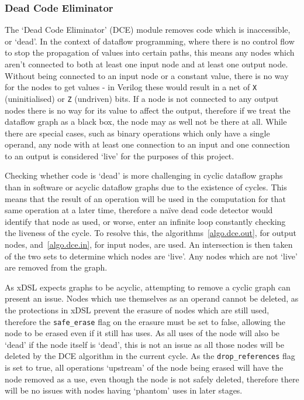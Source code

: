 \subsubsection{Dead Code Eliminator}
The `Dead Code Eliminator' (DCE) module removes code which is inaccessible, or `dead'. In the context of dataflow programming, where there is no control flow to stop the propagation of values into certain paths, this means any nodes which aren't connected to both at least one input node and at least one output node. Without being connected to an input node or a constant value, there is no way for the nodes to get values \hyphen{} in Verilog these would result in a net of \lstinline|X| (uninitialised) or \lstinline|Z| (undriven) bits. If a node is not connected to any output nodes there is no way for its value to affect the output, therefore if we treat the dataflow graph as a black box, the node may as well not be there at all. While there are special cases, such as binary operations which only have a single operand, any node with at least one connection to an input and one connection to an output is considered `live' for the purposes of this project.

Checking whether code is `dead' is more challenging in cyclic dataflow graphs than in software or acyclic dataflow graphs due to the existence of cycles. This means that the result of an operation will be used in the computation for that same operation at a later time, therefore a naïve dead code detector would identify that node as used, or worse, enter an infinite loop constantly checking the liveness of the cycle. To resolve this, the algorithms \ref{algo.dce.out}, for output nodes, and \ref{algo.dce.in}, for input nodes, are used. An intersection is then taken of the two sets to determine which nodes are `live'. Any nodes which are not `live' are removed from the graph.

As xDSL expects graphs to be acyclic, attempting to remove a cyclic graph can present an issue. Nodes which use themselves as an operand cannot be deleted, as the protections in xDSL prevent the erasure of nodes which are still used, therefore the \lstinline|safe_erase| flag on the erasure must be set to false, allowing the node to be erased even if it still has uses. As all uses of the node will also be `dead' if the node itself is `dead', this is not an issue as all those nodes will be deleted by the DCE algorithm in the current cycle. As the \lstinline|drop_references| flag is set to true, all operations `upstream' of the node being erased will have the node removed as a use, even though the node is not safely deleted, therefore there will be no issues with nodes having `phantom' uses in later stages.



